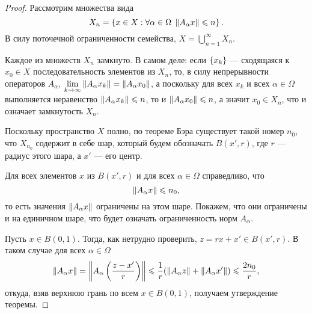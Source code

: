 \begin{proof}
    Рассмотрим множества вида
    \[ X_n = \left\{x \in X : \forall \alpha \in \Omega \; \left\|A_\alpha x\right\| \leqslant n\right\}. \]
    В силу поточечной ограниченности семейства, $X = \bigcup\limits_{n=1}^\infty X_n$.

    Каждое из множеств $X_n$ замкнуто. В самом деле: если $\left\{x_k\right\}$ ---
    сходящаяся к $x_0 \in X$ последовательность элементов из $X_n$, то, в силу непрерывности
    операторов $A_\alpha$, $\lim\limits_{k\to\infty}\left\|A_\alpha x_k\right\|
    =\left\|A_\alpha x_0\right\|$, а поскольку для всех $x_k$ и всех $\alpha \in \Omega$
    выполняется неравенство $\left\|A_\alpha x_k\right\| \leqslant n$, то и $\left\|A_\alpha
    x_0\right\| \leqslant n$, а значит $x_0 \in X_n$, что и означает замкнутость $X_n$.

    Поскольку пространство $X$ полно, по теореме Бэра существует такой номер
    $n_0$, что $X_{n_0}$ содержит в себе шар, который будем 
    обозначать $B(x', r)$, где $r$ --- радиус этого шара, а
    $x'$ --- его центр.

    Для всех элементов $x$ из $B(x', r)$ и для всех $\alpha \in \Omega$ справедливо, что
    \[ \left\|A_\alpha x\right\| \leqslant n_0, \]
    то есть значения $\left\|A_\alpha x\right\|$ ограничены на этом шаре. Покажем, что они
    ограничены и на единичном шаре, что будет означать ограниченность норм
    $A_\alpha$. 
    
    Пусть $x \in B(0, 1)$. Тогда, как нетрудно
    проверить, $z = rx + x' \in B(x', r)$. В таком случае для всех $\alpha \in
    \Omega$
    \[ \left\|A_{\alpha} x\right\| = \left\|A_{\alpha} \left( \frac{z - x'}{r}
    \right)\right\|\leqslant \frac{1}{r} (\left\|A_\alpha z\right\| + \left\|A_\alpha x'\right\|) \leqslant
    \frac{2n_0}{r}, \]
    откуда, взяв верхнюю грань по всем $x \in B(0, 1)$, получаем утверждение
    теоремы.
\end{proof}
